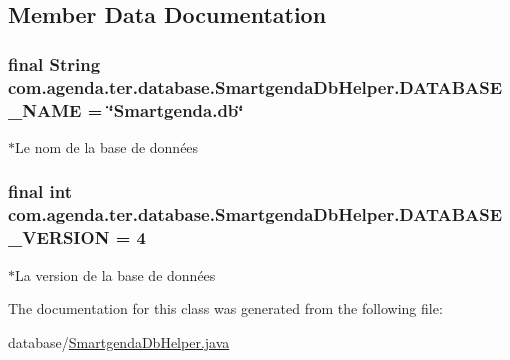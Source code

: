 \subsection{Member Data Documentation}
\hypertarget{classcom_1_1agenda_1_1ter_1_1database_1_1_smartgenda_db_helper_a39d4c02437c5005d4149a17c32e63edd}{
\subsubsection[{D\-A\-T\-A\-B\-A\-S\-E\-\_\-\-N\-A\-M\-E}]{\setlength{\rightskip}{0pt plus 5cm}final String com.\-agenda.\-ter.\-database.\-Smartgenda\-Db\-Helper.\-D\-A\-T\-A\-B\-A\-S\-E\-\_\-\-N\-A\-M\-E = \char`\"{}Smartgenda.\-db\char`\"{}\hspace{0.3cm}{\ttfamily [static]}}}\label{classcom_1_1agenda_1_1ter_1_1database_1_1_smartgenda_db_helper_a39d4c02437c5005d4149a17c32e63edd}
$\ast$\-Le nom de la base de données \hypertarget{classcom_1_1agenda_1_1ter_1_1database_1_1_smartgenda_db_helper_a0e1c44acf581ed313f8cd46529a91a72}{
\subsubsection[{D\-A\-T\-A\-B\-A\-S\-E\-\_\-\-V\-E\-R\-S\-I\-O\-N}]{\setlength{\rightskip}{0pt plus 5cm}final int com.\-agenda.\-ter.\-database.\-Smartgenda\-Db\-Helper.\-D\-A\-T\-A\-B\-A\-S\-E\-\_\-\-V\-E\-R\-S\-I\-O\-N = 4\hspace{0.3cm}{\ttfamily [static]}}}\label{classcom_1_1agenda_1_1ter_1_1database_1_1_smartgenda_db_helper_a0e1c44acf581ed313f8cd46529a91a72}
$\ast$\-La version de la base de données 

The documentation for this class was generated from the following file\-:\begin{DoxyCompactItemize}
\item 
database/\hyperlink{_smartgenda_db_helper_8java}{Smartgenda\-Db\-Helper.\-java}\end{DoxyCompactItemize}
